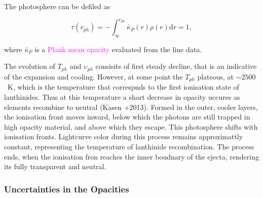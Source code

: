 \documentclass[11pt,a4paper,headinclude=true,DIV=14,BCOR=8mm,chapterprefix,listof=totoc,twoside,openright,abstracton]{scrbook}
\newcommand{\magenta}[1]{\textcolor{magenta}{#1}} %
\begin{document}
The photosphere can be defiled as 

\begin{equation}
    \tau(r_{ph}) = -\int_{\infty}^{r_{ph}} \bar{\kappa}_{P}(r)\rho(r)\text{d}r = 1,
\end{equation}

where $\bar{\kappa}_P$ is a \magenta{Plank mean opacity} evaluated from the line data.

The evolution of $T_{ph}$ and $\upsilon_{ph}$ consisits of first steady decline, that is an indicative of the expansion and cooling. However, at some point the $T_{ph}$ plateous, at $\sim2500$~K, which is the temperature that correspnds to the first ionisation state of lanthinides. Thus at this temperature a shart decrease in opacity uccures as elements recombine to neutral (Kasen +2013). 
Formed in the outer, cooler layers, the ionisation front moves inward, below which the photons are still trapped in high opacity material, and above which they escape. This photosphere shifts with ionisation fronts. Lightcurve color during this process remains approximattly constant, representing the temperature of lanthinide recombination. The process ends, when the ionisation fron reaches the inner boudnary of the ejecta, rendering its fully transparent and neutral. 


\subsubsection{Uncertainties in the Opacities}









\newpage


\end{document}
